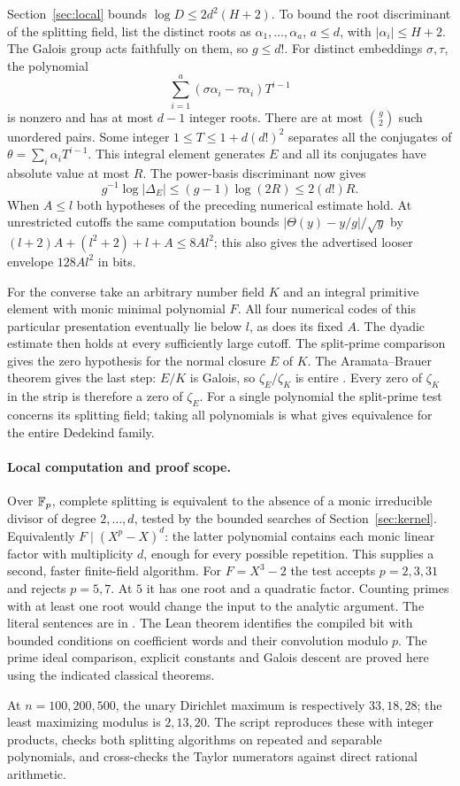 Section~\ref{sec:local} bounds $\log D\le2d^2(H+2)$. To bound the root discriminant of the splitting field, list the distinct roots as $\alpha_1,\ldots,\alpha_a$, $a\le d$, with $|\alpha_i|\le H+2$. The Galois group acts faithfully on them, so $g\le d!$. For distinct embeddings $\sigma,\tau$, the polynomial
\[
   \sum_{i=1}^a (\sigma\alpha_i-\tau\alpha_i)T^{i-1}
\]
is nonzero and has at most $d-1$ integer roots. There are at most $\binom{g}{2}$ such unordered pairs. Some integer $1\le T\le1+d(d!)^2$ separates all the conjugates of $\theta=\sum_i\alpha_iT^{i-1}$. This integral element generates $E$ and all its conjugates have absolute value at most $R$. The power-basis discriminant now gives
\[
    g^{-1}\log|\Delta_E|\le (g-1)\log(2R)\le 2(d!)R .
\]
When $A\le l$ both hypotheses of the preceding numerical estimate hold. At unrestricted cutoffs the same computation bounds $|\Theta(y)-y/g|/\sqrt y$ by $(l+2)A+(l^2+2)+l+A\le8Al^2$; this also gives the advertised looser envelope $128Al^2$ in bits.

For the converse take an arbitrary number field $K$ and an integral primitive element with monic minimal polynomial $F$. All four numerical codes of this particular presentation eventually lie below $l$, as does its fixed $A$. The dyadic estimate then holds at every sufficiently large cutoff. The split-prime comparison gives the zero hypothesis for the normal closure $E$ of $K$. The Aramata--Brauer theorem gives the last step: $E/K$ is Galois, so $\zeta_E/\zeta_K$ is entire \cite{aramata}. Every zero of $\zeta_K$ in the strip is therefore a zero of $\zeta_E$. For a single polynomial the split-prime test concerns its splitting field; taking all polynomials is what gives equivalence for the entire Dedekind family.

\paragraph{Local computation and proof scope.}
Over $\mathbb F_p$, complete splitting is equivalent to the absence of a monic irreducible divisor of degree $2,\ldots,d$, tested by the bounded searches of Section~\ref{sec:kernel}. Equivalently $F\mid(X^p-X)^d$: the latter polynomial contains each monic linear factor with multiplicity $d$, enough for every possible repetition. This supplies a second, faster finite-field algorithm. For $F=X^3-2$ the test accepts $p=2,3,31$ and rejects $p=5,7$. At $5$ it has one root and a quadratic factor. Counting primes with at least one root would change the input to the analytic argument. The literal sentences are in . The Lean theorem  identifies the compiled bit with bounded conditions on coefficient words and their convolution modulo $p$. The prime ideal comparison, explicit constants and Galois descent are proved here using the indicated classical theorems.

At $n=100,200,500$, the unary Dirichlet maximum is respectively $33,18,28$; the least maximizing modulus is $2,13,20$. The script  reproduces these with integer products, checks both splitting algorithms on repeated and separable polynomials, and cross-checks the Taylor numerators against direct rational arithmetic.

